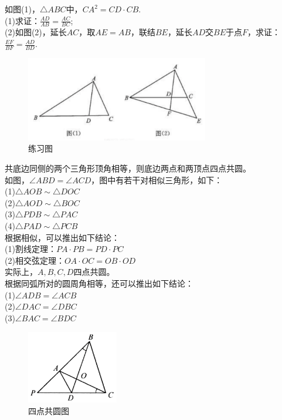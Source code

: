 \documentclass{ecnuthesis}
\begin{document}
\begin{problem}
    如图(1)，$\triangle ABC$中，$CA^2=CD·CB.$ \\
    (1)求证：$\frac{AD}{AB}=\frac{AC}{BC}$; \\
    (2)如图(2)，延长$AC$，取$AE=AB$，联结$BE$，延长$AD$交$BE$于点$F$，求证：$\frac{EF}{BF}=\frac{AD}{BD}.$ \\
\end{problem}
\begin{figure}[H]
\centering
\includegraphics[width=8cm]{picture/850.png}
\caption{练习图}
\end{figure}
\begin{model}
    共底边同侧的两个三角形顶角相等，则底边两点和两顶点四点共圆。\\
    如图，$\angle ABD=\angle ACD$，图中有若干对相似三角形，如下：\\
    (1)$\triangle AOB \sim \triangle DOC $ \\
    (2)$\triangle AOD \sim \triangle BOC $ \\
    (3)$\triangle PDB \sim \triangle PAC $ \\
    (4)$\triangle PAD \sim \triangle PCB $ \\
    根据相似，可以推出如下结论： \\
    (1)割线定理：$PA·PB=PD·PC$ \\
    (2)相交弦定理：$OA·OC=OB·OD$ \\
    实际上，$A,B,C,D$四点共圆。\\
    根据同弧所对的圆周角相等，还可以推出如下结论：\\
    (1)$\angle ADB=\angle ACB$ \\
    (2)$\angle DAC=\angle DBC$ \\
    (3)$\angle BAC=\angle BDC$ \\
\end{model}
\begin{figure}[H]
\centering
\includegraphics[width=4cm]{picture/828.png}
\caption{四点共圆图}
\end{figure}
\end{document}
